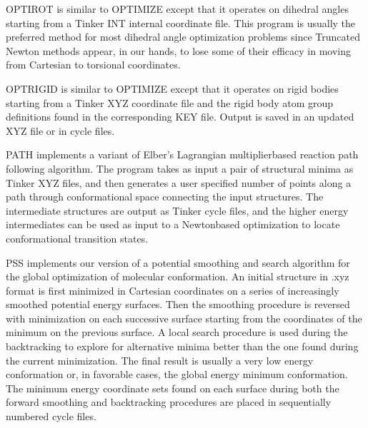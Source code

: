 \documentclass[letterpaper,11pt,english]{sphinxmanual}
\begin{document}
\sphinxAtStartPar
{}

\sphinxAtStartPar
OPTIROT is similar to OPTIMIZE except that it operates on dihedral angles starting from a Tinker INT internal coordinate file. This program is usually the preferred method for most dihedral angle optimization problems since Truncated Newton methods appear, in our hands, to lose some of their efficacy in moving from Cartesian to torsional coordinates.

\sphinxAtStartPar
{}

\sphinxAtStartPar
OPTRIGID is similar to OPTIMIZE except that it operates on rigid bodies starting from a Tinker XYZ coordinate file and the rigid body atom group definitions found in the corresponding KEY file. Output is saved in an updated XYZ file or in cycle files.

\sphinxAtStartPar
{}

\sphinxAtStartPar
PATH implements a variant of Elber’s Lagrangian multiplier\sphinxhyphen{}based reaction path following algorithm. The program takes as input a pair of structural minima as Tinker XYZ files, and then generates a user specified number of points along a path through conformational space connecting the input structures. The intermediate structures are output as Tinker cycle files, and the higher energy intermediates can be used as input to a Newton\sphinxhyphen{}based optimization to locate conformational transition states.

\sphinxAtStartPar
{}

\sphinxAtStartPar
PSS implements our version of a potential smoothing and search algorithm for the global optimization of molecular conformation. An initial structure in .xyz format is first minimized in Cartesian coordinates on a series of increasingly smoothed potential energy surfaces. Then the smoothing procedure is reversed with minimization on each successive surface starting from the coordinates of the minimum on the previous surface. A local search procedure is used during the backtracking to explore for alternative minima better than the one found during the current minimization. The final result is usually a very low energy conformation or, in favorable cases, the global energy minimum conformation. The minimum energy coordinate sets found on each surface during both the forward smoothing and backtracking procedures are placed in sequentially numbered cycle files.

\sphinxAtStartPar
{}
\end{document}

